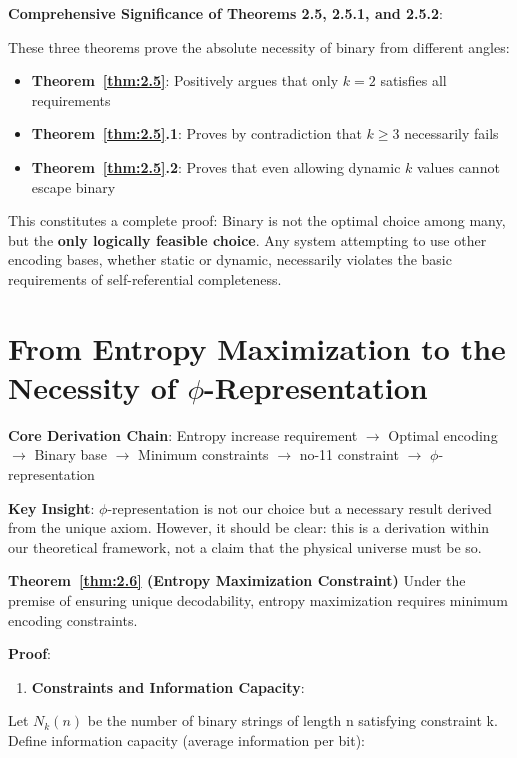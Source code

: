 \textbf{Comprehensive Significance of Theorems 2.5, 2.5.1, and 2.5.2}:

These three theorems prove the absolute necessity of binary from different angles:
\begin{itemize}
\item \textbf{Theorem~\ref{thm:2.5}}: Positively argues that only $k=2$ satisfies all requirements
\label{thm:2.5}
\item \textbf{Theorem~\ref{thm:2.5}.1}: Proves by contradiction that $k \geq 3$ necessarily fails
\label{thm:2.5}
\item \textbf{Theorem~\ref{thm:2.5}.2}: Proves that even allowing dynamic $k$ values cannot escape binary
\label{thm:2.5}
\end{itemize}

This constitutes a complete proof: Binary is not the optimal choice among many, but the \textbf{only logically feasible choice}. Any system attempting to use other encoding bases, whether static or dynamic, necessarily violates the basic requirements of self-referential completeness.

\section{From Entropy Maximization to the Necessity of $\phi$-Representation}
\label{sec:ch04_encoding:from-entropy-maximization-to-the-necessity-of-phi-representation}

\textbf{Core Derivation Chain}:
Entropy increase requirement $\rightarrow$ Optimal encoding $\rightarrow$ Binary base $\rightarrow$ Minimum constraints $\rightarrow$ no-11 constraint $\rightarrow$ $\phi$-representation

\textbf{Key Insight}: $\phi$-representation is not our choice but a necessary result derived from the unique axiom. However, it should be clear: this is a derivation within our theoretical framework, not a claim that the physical universe must be so.

\textbf{Theorem~\ref{thm:2.6} (Entropy Maximization Constraint)}
\label{thm:2.6}
Under the premise of ensuring unique decodability, entropy maximization requires minimum encoding constraints.

\textbf{Proof}:

\begin{enumerate}
\item \textbf{Constraints and Information Capacity}:
\end{enumerate}
   Let $N_k(n)$ be the number of binary strings of length n satisfying constraint k.
   Define information capacity (average information per bit):
   
